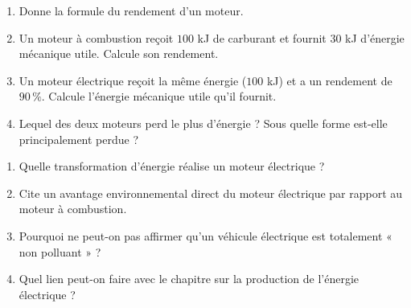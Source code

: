 \begin{enumerate}[label=\arabic*)]
\item Donne la formule du rendement d'un moteur.
\item Un moteur à combustion reçoit $100$ kJ de carburant et fournit $30$ kJ d'énergie
mécanique utile. Calcule son rendement.
\item Un moteur électrique reçoit la même énergie ($100$ kJ) et a un rendement de
$90\,\%$. Calcule l'énergie mécanique utile qu'il fournit.
\item Lequel des deux moteurs perd le plus d'énergie ? Sous quelle forme est-elle
principalement perdue ?
\end{enumerate}

\begin{enumerate}[label=\arabic*)]
\item Quelle transformation d'énergie réalise un moteur électrique ?
\item Cite un avantage environnemental direct du moteur électrique par rapport au
moteur à combustion.
\item Pourquoi ne peut-on pas affirmer qu'un véhicule électrique est totalement « non
polluant » ?
\item Quel lien peut-on faire avec le chapitre sur la production de l'énergie
électrique ?
\end{enumerate}

